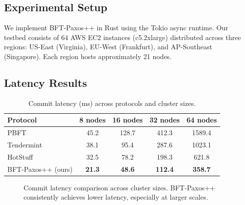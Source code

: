 \documentclass[
    language=english,
    doctype=conference-paper,
    institution=none,
]{../../omnilatex}
\begin{document}
\subsection{Experimental Setup}

We implement BFT-Paxos++ in Rust using the Tokio async runtime. Our testbed consists of
64 AWS EC2 instances (c5.2xlarge) distributed across three regions: US-East (Virginia),
EU-West (Frankfurt), and AP-Southeast (Singapore). Each region hosts approximately 21 nodes.

\subsection{Latency Results}

\begin{table}[htbp]
    \centering
    \caption{Commit latency (ms) across protocols and cluster sizes.}
    \label{tab:latency-results}
    \begin{tabular}{@{}lcccc@{}}
        \toprule
        Protocol         & 8 nodes & 16 nodes & 32 nodes & 64 nodes \\
        \midrule
        PBFT             & 45.2    & 128.7    & 412.3    & 1589.4   \\
        Tendermint        & 38.1    & 95.4     & 287.6    & 1023.1   \\
        HotStuff         & 32.5    & 78.2     & 198.3    & 621.8    \\
        BFT-Paxos++ (ours) & \textbf{21.3} & \textbf{48.6} & \textbf{112.4} & \textbf{358.7} \\
        \bottomrule
    \end{tabular}
\end{table}

\begin{figure}[htbp]
    \centering
    \caption{Commit latency comparison across cluster sizes. BFT-Paxos++ consistently
             achieves lower latency, especially at larger scales.}
    \label{fig:latency-comparison}
\end{figure}
\end{document}
